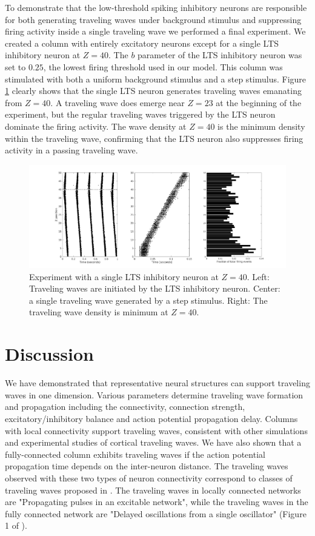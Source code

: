 \documentclass[a4paper,11pt]{article}
\begin{document}
To demonstrate that the low-threshold spiking inhibitory neurons are responsible for both generating traveling waves under background stimulus and suppressing firing activity inside a single traveling wave we performed a final experiment.
We created a column with entirely excitatory neurons except for a single LTS inhibitory neuron at $Z=40$.
The $b$ parameter of the LTS inhibitory neuron was set to $0.25$, the lowest firing threshold used in our model.
This column was stimulated with both a uniform background stimulus and a step stimulus. 
Figure \ref{fig:lts_inhibit} clearly shows that the single LTS neuron generates traveling waves emanating from $Z=40$. 
A traveling wave does emerge near $Z=23$ at the beginning of the experiment, but the regular traveling waves triggered by the LTS neuron dominate the firing activity.
The wave density at $Z=40$ is the minimum density within the traveling wave, confirming that the LTS neuron also suppresses firing activity in a passing traveling wave.
\begin{figure}[!htb]
 \caption{Experiment with a single LTS inhibitory neuron at $Z=40$. Left: Traveling waves are initiated by the LTS inhibitory neuron. Center: a single traveling wave generated by a step stimulus. Right: The traveling wave density is minimum at $Z=40$.}
 \label{fig:lts_inhibit}
 \centering
   \includegraphics[width=\textwidth]{fig/SingleLTSInhibit}
\end{figure}

\FloatBarrier

\section{Discussion}
We have demonstrated that representative neural structures can support traveling waves in one dimension.
Various parameters determine traveling wave formation and propagation including the connectivity, connection strength, excitatory/inhibitory balance and action potential propagation delay.
Columns with local connectivity support traveling waves, consistent with other simulations and experimental studies of cortical traveling waves.
We have also shown that  a fully-connected column exhibits traveling waves if the action potential propagation time depends on the inter-neuron distance. 
The traveling waves observed with these two types of neuron connectivity correspond to classes of traveling waves proposed in \cite{ermentrout2001}.
The traveling waves in locally connected networks are "Propagating pulses in an excitable network", while the traveling waves in the fully connected network are "Delayed oscillations from a single oscillator" (Figure 1 of \cite{ermentrout2001}).
\end{document}
